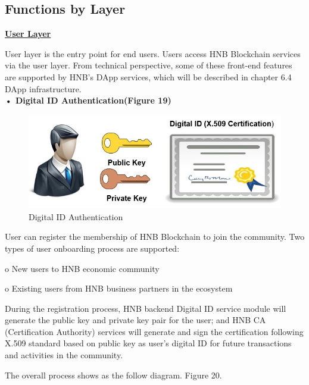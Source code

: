 \documentclass[fleqn,10pt]{SelfArx} %
\begin{document}
\subsection{Functions by Layer}

\underline{\textbf {User Layer}}

User layer is the entry point for end users. Users access HNB Blockchain services via the user layer.
From technical perspective, some of these front-end features are supported by HNB’s DApp services, which will be described in chapter 6.4 DApp infrastructure.\\

\textbf {•	Digital ID Authentication(Figure 19)}

\begin{figure}[ht]\centering
\includegraphics[width=\linewidth]{20}
\caption{Digital ID Authentication}
\label{fig:20}
\end{figure}

User can register the membership of HNB Blockchain to join the community. Two types of user onboarding process are supported:

o	New users to HNB economic community

o	Existing users from HNB business partners in the ecosystem 

During the registration process, HNB backend Digital ID service module will generate the public key and private key pair for the user; and HNB CA (Certification Authority) services will generate and sign the certification following X.509 standard based on public key as user’s digital ID for future transactions and activities in the community.

The overall process shows as the follow diagram. Figure 20.
\end{document}
